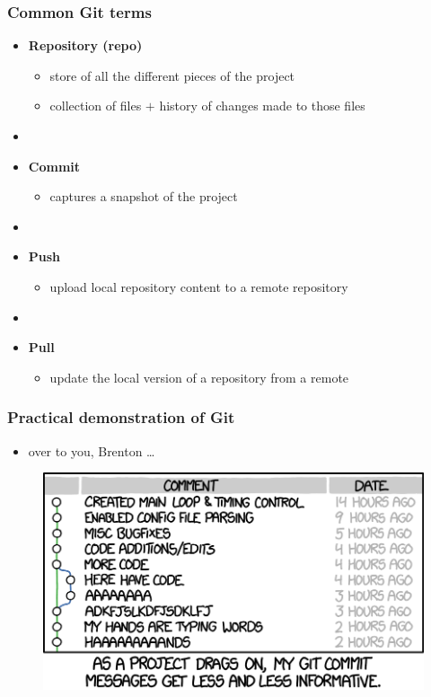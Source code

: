 \documentclass[english,14pt]{beamer}
\begin{document}
\begin{frame}[fragile]

\frametitle{Common Git terms}

\begin{itemize}
	\item \textbf{Repository (repo)}
	\begin{itemize}
		\item store of all the different pieces of the project
		\item collection of files $+$ history of changes made to those files
	\end{itemize}
	\item[]
	\item \textbf{Commit}
	\begin{itemize}
		\item captures a snapshot of the project
	\end{itemize}
	\item[]
	\item \textbf{Push}
	\begin{itemize}
		\item upload local repository content to a remote repository
	\end{itemize}
	\item[]
	\item \textbf{Pull}
	\begin{itemize}
		\item  update the local version of a repository from a remote
	\end{itemize}
\end{itemize}

\end{frame}


\begin{frame}[fragile]

\frametitle{Practical demonstration of Git}

\begin{itemize}
	\item over to you, Brenton \ldots
\end{itemize}

\begin{figure}[ht]
	\centering
	\includegraphics[width=.8\textwidth]{figures/git_commit_2x}
\end{figure}

\end{frame}
\end{document}
